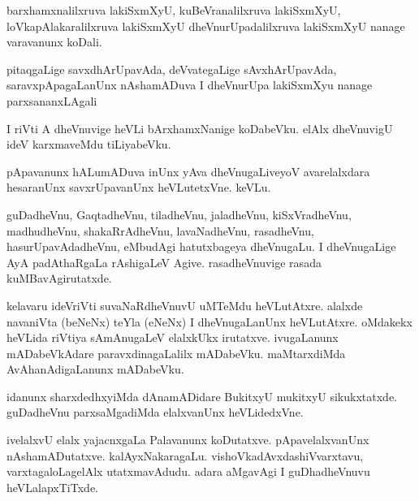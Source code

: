 \documentclass{article}
\begin{document}
\begin{mn}
barxhamxnalilxruva  lakiSxmXyU,  kuBeVranalilxruva  lakiSxmXyU,  loVkapAlakaralilxruva  
lakiSxmXyU  dheVnurUpadalilxruva  lakiSxmXyU  nanage  varavanunx  koDali.
\end{mn}

\begin{mn}
pitaqgaLige  savxdhArUpavAda,  deVvategaLige  sAvxhArUpavAda,  saravxpApagaLanUnx  
nAshamADuva  I  dheVnurUpa  lakiSxmXyu  nanage  parxsananxLAgali
\end{mn}

\begin{mn}
I  riVti  A  dheVnuvige  heVLi  bArxhamxNanige  koDabeVku.  elAlx  dheVnuvigU  
ideV  karxmaveMdu  tiLiyabeVku.
\end{mn}

\begin{mn}
pApavanunx  hALumADuva  inUnx  yAva  dheVnugaLiveyoV  avarelalxdara  hesaranUnx  
savxrUpavanUnx    heVLutetxVne.  keVLu.
\end{mn}

\begin{mn}
guDadheVnu,  GaqtadheVnu,  tiladheVnu,  jaladheVnu,  kiSxVradheVnu,  madhudheVnu,  shakaRrAdheVnu,  
lavaNadheVnu,  rasadheVnu,  hasurUpavAdadheVnu,  eMbudAgi  hatutxbageya  dheVnugaLu.  I  dheVnugaLige 
AyA  padAthaRgaLa  rAshigaLeV  Agive.  rasadheVnuvige  rasada  kuMBavAgirutatxde.
\end{mn}

\begin{mn}
kelavaru  ideVriVti  suvaNaRdheVnuvU  uMTeMdu  heVLutAtxre.  alalxde  navaniVta (beNeNx) 
teYla (eNeNx) I  dheVnugaLanUnx  heVLutAtxre.  oMdakekx  heVLida  riVtiya  sAmAnugaLeV  
elalxkUkx  irutatxve.  ivugaLanunx  mADabeVkAdare  paravxdinagaLalilx  mADabeVku.  
maMtarxdiMda  AvAhanAdigaLanunx  mADabeVku.
\end{mn}

\begin{mn}
idanunx  sharxdedhxyiMda  dAnamADidare  BukitxyU  mukitxyU  sikukxtatxde.  guDadheVnu  
parxsaMgadiMda  elalxvanUnx  heVLidedxVne.
\end{mn}

\begin{mn}
ivelalxvU  elalx  yajacnxgaLa  Palavanunx  koDutatxve.  pApavelalxvanUnx  nAshamADutatxve.  
kalAyxNakaragaLu.  vishoVkadAvxdashiVvarxtavu,  varxtagaloLagelAlx  utatxmavAdudu.  adara  
aMgavAgi  I  guDhadheVnuvu  heVLalapxTiTxde.
\end{mn}
\end{document}
